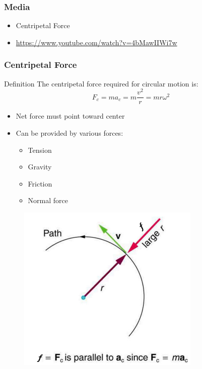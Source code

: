 \documentclass{beamer}
\begin{document}
\begin{frame}
\frametitle{Media}
     \begin{itemize}
  \item Centripetal Force
  \item \hyperlink{https://www.youtube.com/watch?v=4bMawIIWi7w}{https://www.youtube.com/watch?v=4bMawIIWi7w}
  \end{itemize}
\end{frame}
    

\begin{frame}
\frametitle{Centripetal Force}
\begin{block}{Definition}
The centripetal force required for circular motion is:
\[ F_c = ma_c = m\frac{v^2}{r} = mr\omega^2 \]
\end{block}
\begin{itemize}
\item Net force must point toward center
\item Can be provided by various forces:
  \begin{itemize}
  \item Tension
  \item Gravity
  \item Friction
  \item Normal force
  \end{itemize}
\end{itemize}
\end{frame}

\begin{frame}
\begin{figure}
    \centering
    \includegraphics[width=1\linewidth]{CH6/centforce.png}
\end{figure}
\end{frame}
\end{document}
